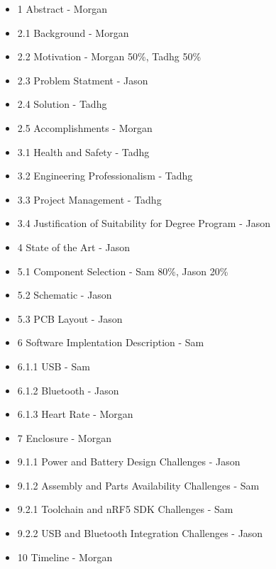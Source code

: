 \begin{itemize}
    \item 1 Abstract - Morgan
    \item 2.1 Background - Morgan
    \item 2.2 Motivation - Morgan 50\%, Tadhg 50\%
    \item 2.3 Problem Statment - Jason
    \item 2.4 Solution - Tadhg
    \item 2.5 Accomplishments - Morgan
    \item 3.1 Health and Safety - Tadhg
    \item 3.2 Engineering Professionalism - Tadhg
    \item 3.3 Project Management - Tadhg
    \item 3.4 Justification of Suitability for Degree Program - Jason
    \item 4 State of the Art - Jason
    \item 5.1 Component Selection - Sam 80\%, Jason 20\%
    \item 5.2 Schematic - Jason
    \item 5.3 PCB Layout - Jason
    \item 6 Software Implentation Description - Sam
    \item 6.1.1 USB - Sam
    \item 6.1.2 Bluetooth - Jason
    \item 6.1.3 Heart Rate - Morgan
    \item 7 Enclosure - Morgan
    \item 9.1.1 Power and Battery Design Challenges - Jason
    \item 9.1.2 Assembly and Parts Availability Challenges - Sam
    \item 9.2.1 Toolchain and nRF5 SDK Challenges - Sam
    \item 9.2.2 USB and Bluetooth Integration Challenges - Jason
    \item 10 Timeline - Morgan
\end{itemize}
